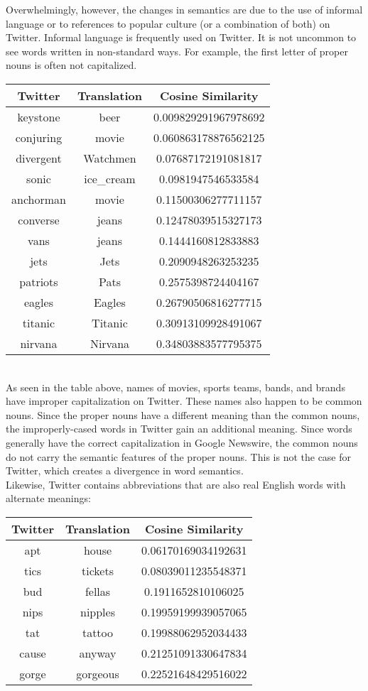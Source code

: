 \documentclass[11pt,a4paper]{article}
\begin{document}
Overwhelmingly, however, the changes in semantics are due to the use of informal language or to references to popular culture (or a combination of both) on Twitter. Informal language is frequently used on Twitter. It is not uncommon to see words written in non-standard ways. For example, the first letter of proper nouns is often not capitalized.
\begin{table}[!htb]
\begin{tabular}{|c|c|c|}
\hline
Twitter & Translation & Cosine Similarity \\
\hline
keystone & beer & 0.009829291967978692\\
conjuring & movie & 0.060863178876562125 \\
divergent & Watchmen & 0.07687172191081817 \\
sonic & ice\_cream & 0.0981947546533584 \\
anchorman & movie & 0.11500306277711157 \\
converse & jeans & 0.12478039515327173 \\
vans & jeans & 0.1444160812833883 \\
jets & Jets & 0.2090948263253235 \\
patriots & Pats & 0.2575398724404167 \\
eagles & Eagles & 0.26790506816277715 \\
titanic & Titanic & 0.30913109928491067 \\
nirvana & Nirvana & 0.34803883577795375 \\
\hline
\end{tabular}
\end{table}\\
As seen in the table above, names of movies, sports teams, bands, and brands have improper capitalization on Twitter. These names also happen to be common nouns. Since the proper nouns have a different meaning than the common nouns, the improperly-cased words in Twitter gain an additional meaning. Since words generally have the correct capitalization in Google Newswire, the common nouns do not carry the semantic features of the proper nouns. This is not the case for Twitter, which creates a divergence in word semantics.\\
Likewise, Twitter contains abbreviations that are also real English words with alternate meanings:
\begin{table}[!htb]
\begin{tabular}{|c|c|c|}
\hline
Twitter & Translation & Cosine Similarity \\
\hline
apt & house & 0.06170169034192631 \\
tics & tickets & 0.08039011235548371 \\
bud & fellas & 0.1911652810106025 \\
nips & nipples & 0.19959199939057065 \\
tat & tattoo & 0.19988062952034433 \\
cause & anyway & 0.21251091330647834 \\
gorge & gorgeous & 0.22521648429516022 \\
\hline
\end{tabular}
\end{table}\\
\end{document}
